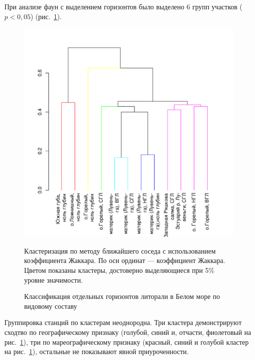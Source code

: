 При анализе фаун с выделением горизонтов было выделено 6 групп участков ($p<0,05$) (рис.~\ref{ris:cluster_white_species_tidal}). 
	\begin{figure}[p]
		\begin{center}
			\includegraphics{../White_Sea/soobshestvo/White_fauna_tidal_jaccard_single_1.pdf}
		\end{center}
	\caption{Классификация отдельных горизонтов литорали в Белом море по видовому составу}
	\label{ris:cluster_white_species_tidal}

	\footnotesize{Кластеризация по методу ближайшего соседа с использованием коэффициента Жаккара. По оси ординат --- коэффициент Жаккара. Цветом показаны кластеры, достоверно выделяющиеся при 5\% уровне значимости.}
	\end{figure}
Группировка станций по кластерам неоднородна. 
Три кластера демонстрируют сходтво по географическому признаку (голубой, синий и, отчасти, фиолетовый на рис.~\ref{ris:cluster_white_species_tidal}), три по мареографическому признаку (красный, синий и голубой кластер на рис.~\ref{ris:cluster_white_species_tidal}), остальные не показывают явной приуроченности.


